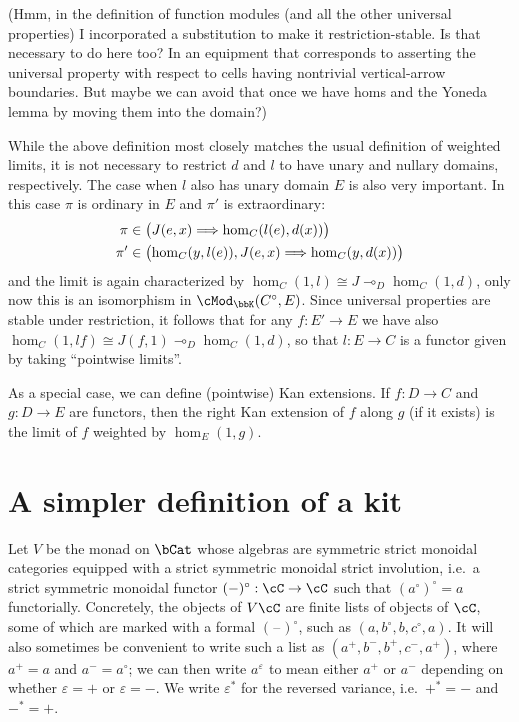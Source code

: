 \documentclass{amsart}
\newcommand{\C}{\cC}
\newcommand{\K}{\bbK}
\let\mod\cMod
\def\modk{\mod_\K}
\def\mor#1{\hom_{#1}}
\newcommand{\blank}{\mathord{\hspace{1pt}\text{--}\hspace{1pt}}}
\renewcommand{\o}{^{\circ}}
\newcommand{\p}{^{+}}
\newcommand{\m}{^{-}}
\newcommand{\e}[1][]{^{\varepsilon_{#1}}}
\let\vdash\Longrightarrow
\let\mto\vdash    %
\def\mhom#1#2{\left( #1 \vphantom{\big|}\mto #2 \right)}
\begin{document}
(Hmm, in the definition of function modules (and all the other universal properties) I incorporated a substitution to make it restriction-stable.  Is that necessary to do here too?  In an equipment that corresponds to asserting the universal property with respect to cells having nontrivial vertical-arrow boundaries.  But maybe we can avoid that once we have homs and the Yoneda lemma by moving them into the domain?)

While the above definition most closely matches the usual definition of weighted limits, it is not necessary to restrict $d$ and $l$ to have unary and nullary domains, respectively.
The case when $l$ also has unary domain $E$ is also very important.
In this case $\pi$ is ordinary in $E$ and $\pi'$ is extraordinary:
\begin{align*}
\pi &\in \mhom{J(e,x)}{\mor{C}(l(e),d(x))} \\
\pi' &\in \mhom{\mor{C}(y,l(e)),J(e,x)}{\mor{C}(y,d(x))}
\end{align*}
and the limit is again characterized by $\mor{C}(1,l) \cong J \multimap_D \mor{C}(1,d)$, only now this is an isomorphism in $\modk(C\o,E)$.
Since universal properties are stable under restriction, it follows that for any $f:E'\to E$ we have also $\mor{C}(1,l f) \cong J(f,1) \multimap_D \mor{C}(1,d)$, so that $l:E\to C$ is a functor given by taking ``pointwise limits''.

As a special case, we can define (pointwise) Kan extensions.
If $f:D\to C$ and $g:D\to E$ are functors, then the right Kan extension of $f$ along $g$ (if it exists) is the limit of $f$ weighted by $\mor{E}(1,g)$.

\newpage
\part{A simpler definition of a kit}
\label{part:def2}

Let $V$ be the monad on $\bCat$ whose algebras are symmetric strict monoidal categories equipped with a strict symmetric monoidal strict involution, i.e.\ a strict symmetric monoidal functor $(-)\o : \C\to\C$ such that $(a\o)\o =a$ functorially.
Concretely, the objects of $V\C$ are finite lists of objects of $\C$, some of which are marked with a formal $(\blank)\o$, such as $(a,b\o,b,c\o,a)$.
It will also sometimes be convenient to write such a list as $(a\p,b\m,b\p,c\m,a\p)$, where $a\p=a$ and $a\m=a\o$; we can then write $a\e$ to mean either $a\p$ or $a\m$ depending on whether $\varepsilon=+$ or $\varepsilon=-$.
We write $\varepsilon^*$ for the reversed variance, i.e.\ $+^*=-$ and $-^*=+$.
\end{document}
